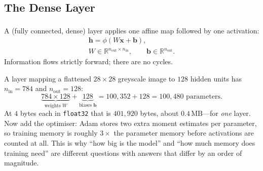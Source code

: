 \subsection{The Dense Layer}

A  (fully connected, dense) layer applies one affine map
followed by one activation\textsuperscript{\cite[][pp.~15--17]{fleuretLittleBookDeep}}:
\begin{equation}
  \begin{gathered}
    \mathbf{h} = \phi\!\left(W\mathbf{x} + \mathbf{b}\right),\\[2pt]
    W \in \mathbb{R}^{n_{\text{out}}\times n_{\text{in}}},\qquad
    \mathbf{b}\in\mathbb{R}^{n_{\text{out}}} .
  \end{gathered}
  \label{eq:dl-dense}
\end{equation}
Information flows strictly forward; there are no cycles.

\begin{workedexample}
A layer mapping a flattened $28\times28$ greyscale image to $128$ hidden units
has $n_{\text{in}} = 784$ and $n_{\text{out}} = 128$:
\[
  \underbrace{784\times128}_{\text{weights } W} +
  \underbrace{128}_{\text{biases } \mathbf{b}} = 100{,}352 + 128 = 100{,}480
  \text{ parameters.}
\]
At $4$ bytes each in \texttt{float32} that is $401{,}920$ bytes, about
$0.4\,\text{MB}$---for \emph{one} layer. Now add the optimiser: Adam stores two
extra moment estimates per parameter, so training memory is roughly
$3\times$ the parameter memory before activations are counted at all. This is
why ``how big is the model'' and ``how much memory does training need'' are
different questions with answers that differ by an order of magnitude.
\end{workedexample}

